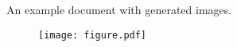 \documentclass{article}
\begin{document}
An example document with generated images.

\begin{figure}\texttt{[image: figure.pdf]}\end{figure}
  
\begin{figure}\end{figure}
  
\end{document}
